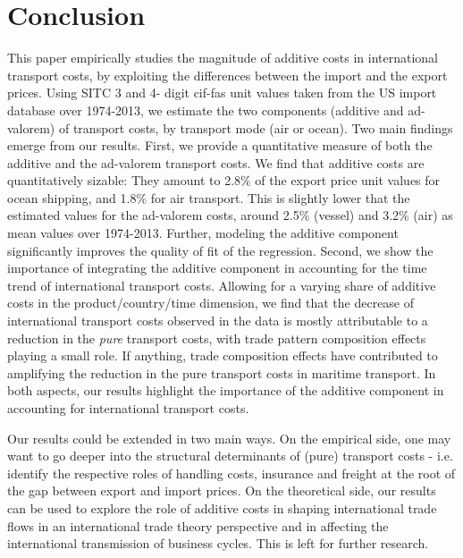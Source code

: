 \documentclass[a4paper,11pt]{article}
\begin{document}
\section{Conclusion \label{sec:conclu}}

This paper empirically studies the magnitude of additive costs in international transport costs, by exploiting the differences between the import and the export prices.
Using SITC 3 and 4- digit cif-fas unit values taken from the US import database over 1974-2013, we estimate the two components (additive and ad-valorem) of transport costs, by transport mode (air or ocean).
Two main findings emerge from our results.
First, we provide a quantitative measure of both the additive and the ad-valorem transport costs.
We find that additive costs are quantitatively sizable: They amount to 2.8\% of the export price unit values for ocean shipping, and 1.8\% for air transport.
This is slightly lower that the estimated values for the ad-valorem costs, around  2.5\% (vessel) and 3.2\% (air) as mean values over 1974-2013.
Further, modeling the additive component significantly improves the quality of fit of the regression.
Second, we show the importance of integrating the additive component in accounting for the time trend of international transport costs.
Allowing for a varying share of additive costs in the product/country/time dimension, we find that the decrease of international transport costs observed in the data is mostly attributable to a reduction in the \textit{pure} transport costs, with trade pattern composition effects playing a small role.
If anything, trade composition effects have contributed to amplifying the reduction in the pure transport costs in maritime transport.
In both aspects, our results highlight the importance of the additive component in accounting for international transport costs.

Our results could be extended in two main ways.
On the empirical side, one may want to go deeper into the structural determinants of (pure) transport costs - i.e.
identify the respective roles of handling costs, insurance and freight at the root of the gap between export and import prices.
On the theoretical side, our results can be used to explore the role of additive costs in shaping international trade flows in an international trade theory perspective and in affecting the international transmission of business cycles.
This is left for further research.



\newpage


\end{document}

